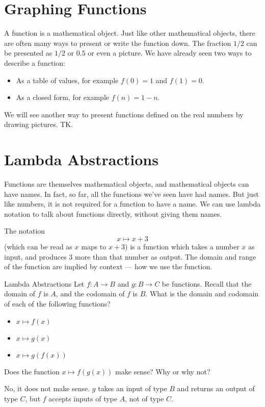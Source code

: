 \documentclass[a4paper,10pt]{report}
\begin{document}
\section{Graphing Functions}

A function is a mathematical object. Just like other mathematical objects, there are often
many ways to present or write the function down. The fraction \(1/2\) can be presented as
\(1/2\) or \(0.5\) or even a picture. We have already seen two ways to describe a function:

\begin{itemize}
  \item As a table of values, for example \(f(0) = 1\) and \(f(1) = 0\).
  \item As a closed form, for example \(f(n) = 1 - n\).
\end{itemize}

We will see another way to present functions defined on the real numbers by drawing
pictures. TK.

\section{Lambda Abstractions}

Functions are themselves mathematical objects, and mathematical objects can have names. In
fact, so far, all the functions we've seen have had names. But just like numbers, it is not
required for a function to have a name. We can use lambda notation to talk about functions
directly, without giving them names.

The notation \begin{equation}
  x \mapsto x + 3
  \label{fov:lambdap3}
\end{equation} (which can be read as \(x\) maps to \(x+3\)) is a function which takes a
number \(x\) as input, and produces \(3\) more than that number as output. The domain and
range of the function are implied by context --- how we use the function.

\begin{problem}{Lambda Abstractions}
  Let \(f: A \to B\) and \(g: B \to C\) be functions. Recall that the domain of \(f\) is
  \(A\), and the codomain of \(f\) is \(B\). What is the domain and codomain of each of the
  following functions?

  \begin{itemize}
    \item \(x \mapsto f(x)\) \hfill {}
    \item \(x \mapsto g(x)\) \hfill {}
    \item \(x \mapsto g(f(x))\) \hfill {}
  \end{itemize}

  Does the function \(x \mapsto f(g(x))\) make sense? Why or why not?

  \begin{solution}
    No, it does not make sense. \(g\) takes an input of type \(B\) and returns an
    output of type \(C\), but \(f\) accepts inputs of type \(A\), not of type \(C\).
  \end{solution}
\end{problem}
\end{document}
